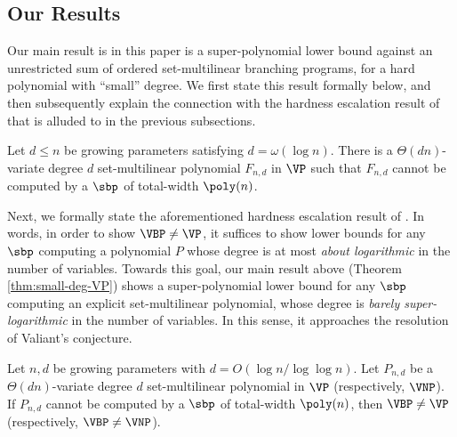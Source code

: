 \documentclass{article}
\begin{document}
\subsection{Our Results}\label{subsec:our-results}

Our main result is in this paper is a super-polynomial lower bound against an {unrestricted} sum of ordered set-multilinear branching programs, for a hard polynomial with ``small'' degree. We first state this result formally below, and then subsequently explain the connection with the hardness escalation result of \cite{BDS23} that is alluded to in the previous subsections.

\begin{theorem}\label{thm:small-deg-VP}
Let $d\leq n$ be growing parameters satisfying $d = \omega(\log n)$. There is a $\Theta(dn)$-variate degree $d$ set-multilinear polynomial $F_{n,d}$ in $\VP$ such that $F_{n,d}$  cannot be computed by a $\sbp$ of total-width $\poly(n)$.
\end{theorem}

Next, we formally state the aforementioned hardness escalation result of \cite{BDS23}. In words, {in order to show $\VBP\neq \VP$, it suffices to show lower bounds for any $\sbp$ computing a polynomial $P$ whose degree is at most \emph{about logarithmic} in the number of variables.} %
Towards this goal,  our main result above (Theorem \ref{thm:small-deg-VP}) shows a super-polynomial lower bound for any $\sbp$ computing an explicit set-multilinear polynomial, whose degree is \emph{barely super-logarithmic} in the number of variables. In this sense, it approaches the resolution of Valiant's conjecture.

\begin{theorem}\label{thm:hard-esc}
Let $n, d$ be growing parameters with $d = O(\log n/\log \log n)$. Let $P_{n,d}$ be a $\Theta(dn)$-variate degree $d$ set-multilinear polynomial in $\VP$ (respectively, $\VNP$). If $P_{n,d}$ cannot be computed by a $\sbp$ of total-width $\poly(n)$, then
$\VBP\neq \VP$ (respectively, $\VBP \neq \VNP$).
\end{theorem}
\end{document}

